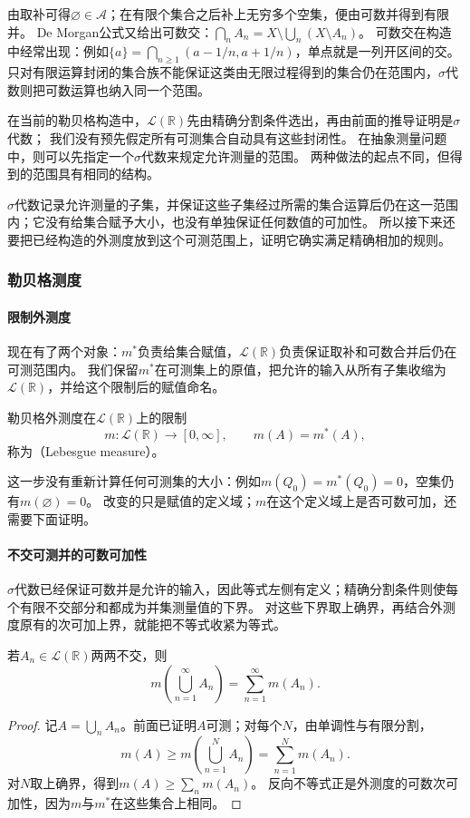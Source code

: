 由取补可得$\varnothing\in\mathcal A$；在有限个集合之后补上无穷多个空集，便由可数并得到有限并。
De Morgan公式又给出可数交：$\bigcap_nA_n=X\setminus\bigcup_n(X\setminus A_n)$。
可数交在构造中经常出现：例如$\{a\}=\bigcap_{n\geq1}(a-1/n,a+1/n)$，单点就是一列开区间的交。
只对有限运算封闭的集合族不能保证这类由无限过程得到的集合仍在范围内，$\sigma$代数则把可数运算也纳入同一个范围。

在当前的勒贝格构造中，$\mathcal L(\mathbb R)$先由精确分割条件选出，再由前面的推导证明是$\sigma$代数；
我们没有预先假定所有可测集合自动具有这些封闭性。
在抽象测量问题中，则可以先指定一个$\sigma$代数来规定允许测量的范围。
两种做法的起点不同，但得到的范围具有相同的结构。

$\sigma$代数记录允许测量的子集，并保证这些子集经过所需的集合运算后仍在这一范围内；它没有给集合赋予大小，也没有单独保证任何数值的可加性。
所以接下来还要把已经构造的外测度放到这个可测范围上，证明它确实满足精确相加的规则。

\subsubsection{勒贝格测度}

\paragraph{限制外测度}

现在有了两个对象：$m^*$负责给集合赋值，$\mathcal L(\mathbb R)$负责保证取补和可数合并后仍在可测范围内。
我们保留$m^*$在可测集上的原值，把允许的输入从所有子集收缩为$\mathcal L(\mathbb R)$，并给这个限制后的赋值命名。
\begin{definition}[勒贝格测度]
\label{def:analysis-lebesgue-measure}
勒贝格外测度在$\mathcal L(\mathbb R)$上的限制
\[
 m:\mathcal L(\mathbb R)\to[0,\infty],\qquad m(A)=m^*(A),
\]
称为（Lebesgue measure）。
\end{definition}

这一步没有重新计算任何可测集的大小：例如$m(Q_0)=m^*(Q_0)=0$，空集仍有$m(\varnothing)=0$。
改变的只是赋值的定义域；$m$在这个定义域上是否可数可加，还需要下面证明。

\paragraph{不交可测并的可数可加性}

$\sigma$代数已经保证可数并是允许的输入，因此等式左侧有定义；精确分割条件则使每个有限不交部分和都成为并集测量值的下界。
对这些下界取上确界，再结合外测度原有的次可加上界，就能把不等式收紧为等式。
\begin{theorem}[勒贝格测度的可数可加性]
\label{thm:analysis-lebesgue-countable-additivity}
若$A_n\in\mathcal L(\mathbb R)$两两不交，则
\[
 m\left(\bigcup_{n=1}^{\infty}A_n\right)=\sum_{n=1}^{\infty}m(A_n).
\]
\end{theorem}
\begin{proof}
记$A=\bigcup_n A_n$。前面已证明$A$可测；对每个$N$，由单调性与有限分割，
\[
 m(A)\geq m\left(\bigcup_{n=1}^NA_n\right)=\sum_{n=1}^Nm(A_n).
\]
对$N$取上确界，得到$m(A)\geq\sum_n m(A_n)$。
反向不等式正是外测度的可数次可加性，因为$m$与$m^*$在这些集合上相同。
\end{proof}

